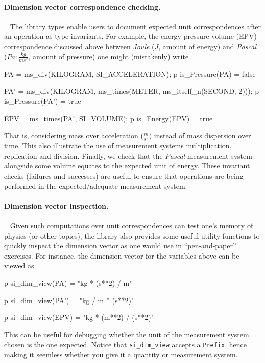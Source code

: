 \documentclass[runningheads,a4paper]{llncs}
\begin{document}
\paragraph*{Dimension vector correspondence checking.}~
%
The library types enable users to document expected unit correspondences after an operation as type invariants. For example, the energy-pressure-volume (EPV) correspondence discussed above between \textit{Joule} (\(J\), amount of energy) and \textit{Pascal} (\(Pa: \frac{kg}{ms^2}\), amount of pressure) one might (mistakenly) write
%
\begin{vdmsl}[frame=none,basicstyle=\ttfamily\scriptsize]
    PA = ms_div(KILOGRAM, SI_ACCELERATION);
    p is_Pressure(PA) 
    = false

    PA' = ms_div(KILOGRAM, ms_times(METER, ms_itself_n(SECOND, 2)));
    p is_Pressure(PA')
    = true

    EPV = ms_times(PA', SI_VOLUME);
    p is_Energy(EPV)
    = true
\end{vdmsl}
%
\noindent That is, considering mass over acceleration (\(\frac{m}{s^2}\)) instead of mass dispersion over time. This also illustrate the use of measurement systems multiplication, replication and division. Finally, we check that the \textit{Pascal} measurement system alongside some volume equates to the expected unit of energy. These invariant checks (failures and successes) are useful to ensure that operations are being performed in the expected/adequate measurement system.  


\paragraph*{Dimension vector inspection.}~
%
Given such computations over unit correspondences can test one's memory of physics (or other topics), the library also provides some useful utility functions to quickly inspect the dimension vector as one would use in ``pen-and-paper'' exercises. For instance, the dimension vector for the variables above can be viewed as
%
\begin{vdmsl}[frame=none,basicstyle=\ttfamily\scriptsize]
    p si_dim_view(PA)
    = "kg * (s**2) / m" 

    p si_dim_view(PA')
    = "kg / m * (s**2)"

    p si_dim_view(EPV)
    = "kg * (m**2) / (s**2)"
\end{vdmsl}   
%
\noindent This can be useful for debugging whether the unit of the measurement system chosen is the one expected. Notice that \texttt{si\_dim\_view} accepts a \texttt{Prefix}, hence making it seemless whether you give it a quantity or measurement system. 
\end{document}

